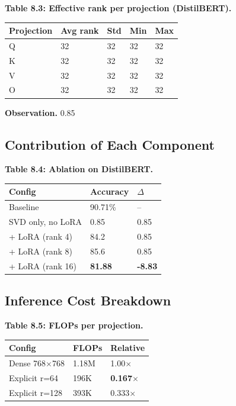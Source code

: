\textbf{Table 8.3: Effective rank per projection (DistilBERT).}

\begin{table}[H]
\centering
\small
\begin{tabular}{lllll}
\toprule
\textbf{Projection} & \textbf{Avg rank} & \textbf{Std} & \textbf{Min} & \textbf{Max} \\
\midrule
Q & 32 & 32 & 32 & 32 \\
K & 32 & 32 & 32 & 32 \\
V & 32 & 32 & 32 & 32 \\
O & 32 & 32 & 32 & 32 \\
\bottomrule
\end{tabular}
\end{table}

\textbf{Observation.} 0.85

\subsection{Contribution of Each Component}

\textbf{Table 8.4: Ablation on DistilBERT.}

\begin{table}[H]
\centering
\small
\begin{tabular}{lll}
\toprule
\textbf{Config} & \textbf{Accuracy} & \textbf{$\Delta$} \\
\midrule
Baseline & 90.71\% & -- \\
SVD only, no LoRA & 0.85 & 0.85 \\
+ LoRA (rank 4) & 84.2 & 0.85 \\
+ LoRA (rank 8) & 85.6 & 0.85 \\
+ LoRA (rank 16) & \textbf{81.88} & \textbf{-8.83} \\
\bottomrule
\end{tabular}
\end{table}

\subsection{Inference Cost Breakdown}

\textbf{Table 8.5: FLOPs per projection.}

\begin{table}[H]
\centering
\small
\begin{tabular}{lll}
\toprule
\textbf{Config} & \textbf{FLOPs} & \textbf{Relative} \\
\midrule
Dense 768$\times$768 & 1.18M & 1.00$\times$ \\
Explicit r=64 & 196K & \textbf{0.167$\times$} \\
Explicit r=128 & 393K & 0.333$\times$ \\
\bottomrule
\end{tabular}
\end{table}

